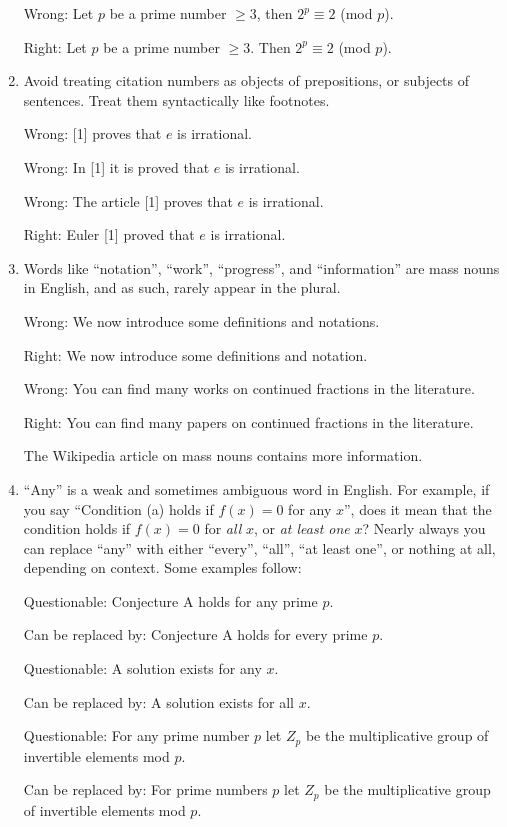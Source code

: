 \documentclass[12pt]{article}
\begin{document}
\begin{enumerate}
Wrong:  Let $p$ be a prime number $\geq 3$, then $2^p \equiv 2$ (mod $p$).

Right:  Let $p$ be a prime number $\geq 3$.  Then $2^p \equiv 2$ (mod $p$).

\item Avoid treating citation numbers as objects of prepositions, or
subjects of sentences.
Treat them syntactically like footnotes.

Wrong:  [1] proves that $e$ is irrational.

Wrong:  In [1] it is proved that $e$ is irrational.

Wrong:  The article [1] proves that $e$ is irrational.

Right:  Euler [1] proved that $e$ is irrational.

\item Words like ``notation'', ``work'', ``progress'',
and ``information'' are mass
nouns in English, and as such, rarely appear in the plural.

Wrong:  We now introduce some definitions and notations.

Right:  We now introduce some definitions and notation.

\bigskip

Wrong:  You can find many works on continued fractions in the literature.

Right:  You can find many papers on continued fractions in the literature.

The Wikipedia article on mass nouns contains more information.

\item ``Any'' is a weak and sometimes ambiguous word in English.  For example,
if you say ``Condition (a) holds if $f(x) = 0$ for any $x$'', does it mean
that the condition holds if $f(x) = 0$ for {\it all\/} $x$, or 
{\it at least one\/} $x$?   Nearly always you can replace ``any'' with
either ``every'', ``all'', ``at least one'', or nothing at all, depending
on context.   Some examples follow:

Questionable:  Conjecture A holds for any prime $p$.

Can be replaced by:  Conjecture A holds for every prime $p$.

Questionable:   A solution exists for any $x$.

Can be replaced by:   A solution exists for all $x$.

Questionable:  For any prime number $p$ let $Z_p$ be the multiplicative group of invertible elements mod $p$.

Can be replaced by:  For prime numbers $p$ 
let $Z_p$ be the multiplicative group of invertible elements mod $p$.



\end{enumerate}
\end{document}
